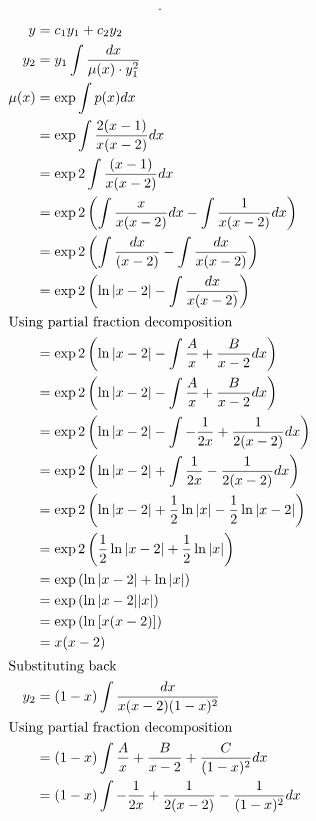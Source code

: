 \documentclass{zc-ust-hw}
\begin{document}
\begin{enumerate}
\begin{enumerate}
\begin{sol}
\begin{align}
            .\end{align}
            \begin{align}
              y &= c_{1}y_{1}+c_{2}y_{2} \\
              y_{2} &= y_{1}\int \frac{dx}{\mu (x) \cdot y_{1}^2} \\
              \mu (x) &= \exp \int p(x)dx \\
              &= \exp \int \frac{2(x-1)}{x(x-2)}dx \\
              &= \exp 2 \int \frac{(x-1)}{x(x-2)}dx \\
              &= \exp 2 \left( \int \frac{x}{x(x-2)}dx - \int \frac{1}{x(x-2)}dx \right) \\
              &= \exp 2 \left( \int \frac{dx}{(x-2)} - \int \frac{dx}{x(x-2)} \right) \\
              &= \exp 2 \left( \ln|x-2| - \int \frac{dx}{x(x-2)} \right) \\
              \intertext{Using partial fraction decomposition}
              &= \exp 2 \left( \ln|x-2| - \int \frac{A}{x}+\frac{B}{x-2} dx\right) \\
              &= \exp 2 \left( \ln|x-2| - \int \frac{A}{x}+\frac{B}{x-2} dx\right) \\
              &= \exp 2 \left( \ln|x-2| - \int -\frac{1}{2x}+\frac{1}{2(x-2)} dx \right) \\
              &= \exp 2 \left( \ln|x-2| + \int \frac{1}{2x}-\frac{1}{2(x-2)} dx \right) \\
              &= \exp 2 \left( \ln|x-2| + \frac{1}{2}\ln |x| -\frac{1}{2}\ln|x-2| \right) \\
              &= \exp 2 \left( \frac{1}{2}\ln|x-2| + \frac{1}{2}\ln |x| \right) \\
              &= \exp \left( \ln|x-2| + \ln |x| \right) \\
              &= \exp \left( \ln|x-2||x| \right) \\
              &= \exp \left( \ln\left[ x(x-2) \right] \right) \\
              &= x(x-2) \\
              \intertext{Substituting back}
              y_{2} &= (1-x)\int \frac{dx}{x(x-2)(1-x)^2} \\
              \intertext{Using partial fraction decomposition}
              &= (1-x)\int \frac{A}{x}+\frac{B}{x-2}+\frac{C}{(1-x)^2}dx \\
              &= (1-x)\int-\frac{1}{2x}+\frac{1}{2(x-2)}-\frac{1}{(1-x)^2}dx \\

\end{align}
\end{sol}
\end{enumerate}
\end{enumerate}
\end{document}
